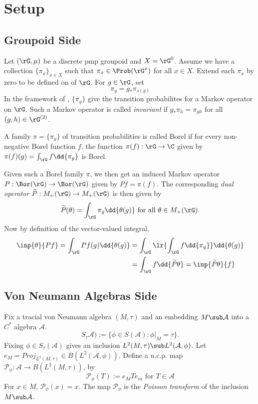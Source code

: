 \documentclass[../main.tex]{subfiles}
\begin{document}
\section{Setup}

\subsection{Groupoid Side}

Let $ (\rG, \mu) $ be a discrete pmp groupoid and $ X = \rG^{0} $. Assume we have a collection $ \{\pi_{x}\}_{x\in X} $ such that $ \pi_{x}\in \Prob(\rG^{x}) $ for all $ x\in X $. Extend each $ \pi_{x} $ by zero to be defined on of $ \rG $. For $ g\in \rG $, set
\[
    \pi_{g} = g_{*}\pi_{s(g)}
\]
In the framework of \cite{kai:05}, $ \{\pi_{g}\} $ give the transition probabilites for a Markov operator on $ \rG $. Such a Markov operator is called \textit{invariant} if $ g_{*} \pi_{h} = \pi_{gh} $ for all $(g,h) \in \rG^{(2)} $.\\


\begin{definition}
  A family $ \pi = \{\pi_{g}\} $ of transition probabilities is called Borel if for every non-negative Borel function $ f $, the function $ \pi(f):\rG\to \C $ given by $ \pi(f)(g) = \int_{\rG} f \dd{\pi_{g}} $ is Borel. 
\end{definition}

Given such a Borel family $ \pi $, we then get an induced Markov operator $ P:\Bor(\rG)\to\Bor(\rG) $ given by $ Pf = \pi(f) $. The corresponding \textit{dual operator} $ \widetilde{P}:M_{+}(\rG)\to M_{+}(\rG) $ is then given by 
\[
  \widetilde{P}(\theta) = \int_{\rG} \pi_{g} \dd{\theta(g)} \text{ for all } \theta\in M_{+}(\rG).
\]
Now by definition of the vector-valued integral,
\begin{align*}
  \inp{\theta}{Pf} = \int_{\rG} Pf(g) \dd{\theta(g)} &= \int_{\rG} \lr{\int_{\rG}f \dd{\pi_{g}}} \dd{\theta(g)}\\
  &= \int_{\rG} f \dd{\widetilde{P} \theta} = \inp{\widetilde{P} \theta}{f}
\end{align*}



\subsection{Von Neumann Algebras Side}


Fix a tracial von Neumann algebra $ (M,\tau) $ and an embedding $ M\sub \mathcal{A} $ into a $ C^{*} $ algebra $ \mathcal{A} $.
\[
  S_{\tau}\mathcal{A}) := \{\phi\in S(\mathcal{A}) : \phi\vert_{M} = \tau\}.
\]
Fixing $ \phi\in S_{\tau}(\mathcal{A}) $ gives an inclusion $ L^{2}(M,\tau)\sub L^{2}(\mathcal{A},\phi) $. Let $ e_{M} = Proj_{L^{2}(M,\tau)}\in B(L^{2}(\mathcal{A},\phi)) $. Define a u.c.p. map $ \mathcal{P}_{\phi}:\mathcal{A} \to B(L^{2}(M,\tau))$, by
\[
  \mathcal{P}_{\phi}(T) := e_{M}Te_{m} \text{ for }T\in \mathcal{A}
\]
For $ x\in M $, $ \mathcal{P}_{\phi}(x) = x $. The map $ \mathcal{P}_{\phi} $ is the \textit{Poisson transform} of the inclusion $ M\sub \mathcal{A} $. 
\end{document}
